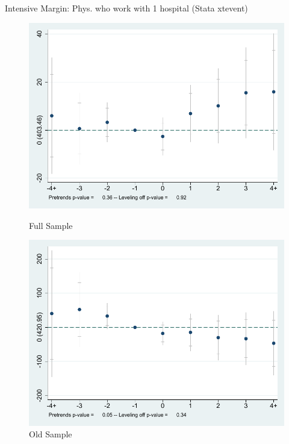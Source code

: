 \documentclass[10pt]{beamer}
\begin{document}
\begin{frame}{Intensive Margin: Phys. who work with 1 hospital (Stata xtevent)}
\begin{figure}[ht]
        \begin{minipage}[b]{0.47\linewidth}
            \centering
            \includegraphics[width=\textwidth]{Objects/xtevent_hosp_fullsample.pdf}
            \caption{Full Sample}
            \label{fig:a}
        \end{minipage}
        \hspace{0.2cm}
        \begin{minipage}[b]{0.47\linewidth}
            \centering
            \includegraphics[width=\textwidth]{Objects/xtevent_hosp_oldsample.pdf}
            \caption{Old Sample}
            \label{fig:b}
        \end{minipage}
    \end{figure}
\end{frame}
\end{document}
